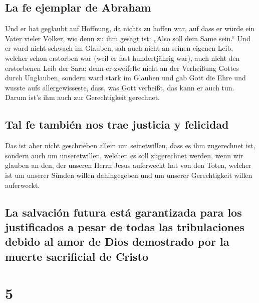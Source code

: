 \hypertarget{la-fe-ejemplar-de-abraham}{%
\subsection{La fe ejemplar de Abraham}\label{la-fe-ejemplar-de-abraham}}

 Und er hat geglaubt auf Hoffnung, da nichts zu hoffen
war, auf dass er würde ein Vater vieler Völker, wie denn zu ihm gesagt
ist: „Also soll dein Same sein.``  Und er ward nicht
schwach im Glauben, sah auch nicht an seinen eigenen Leib, welcher schon
erstorben war (weil er fast hundertjährig war), auch nicht den
erstorbenen Leib der Sara;  denn er zweifelte nicht an
der Verheißung Gottes durch Unglauben, sondern ward stark im Glauben und
gab Gott die Ehre  und wusste aufs allergewisseste, dass,
was Gott verheißt, das kann er auch tun.  Darum ist's ihm
auch zur Gerechtigkeit gerechnet.

\hypertarget{tal-fe-tambiuxe9n-nos-trae-justicia-y-felicidad}{%
\subsection{Tal fe también nos trae justicia y
felicidad}\label{tal-fe-tambiuxe9n-nos-trae-justicia-y-felicidad}}

 Das ist aber nicht geschrieben allein um seinetwillen,
dass es ihm zugerechnet ist,  sondern auch um
unseretwillen, welchen es soll zugerechnet werden, wenn wir glauben an
den, der unseren Herrn Jesus auferweckt hat von den Toten,
 welcher ist um unserer Sünden willen dahingegeben und um
unserer Gerechtigkeit willen auferweckt.

\hypertarget{la-salvaciuxf3n-futura-estuxe1-garantizada-para-los-justificados-a-pesar-de-todas-las-tribulaciones-debido-al-amor-de-dios-demostrado-por-la-muerte-sacrificial-de-cristo}{%
\subsection{La salvación futura está garantizada para los justificados a
pesar de todas las tribulaciones debido al amor de Dios demostrado por
la muerte sacrificial de
Cristo}\label{la-salvaciuxf3n-futura-estuxe1-garantizada-para-los-justificados-a-pesar-de-todas-las-tribulaciones-debido-al-amor-de-dios-demostrado-por-la-muerte-sacrificial-de-cristo}}

\hypertarget{section-4}{%
\section{5}\label{section-4}}

